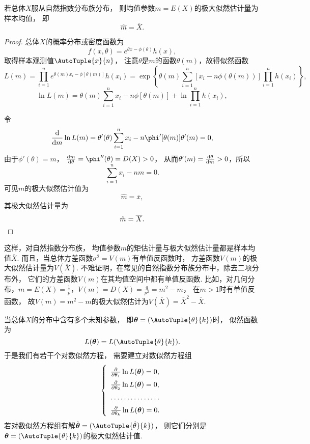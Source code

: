 \begin{theorem}
若总体\(X\)服从自然指数分布族分布，
则均值参数\(m=E(X)\)的极大似然估计量为样本均值，
即\[
	\hat{m}=\overline{X}.
\]
\begin{proof}
总体\(X\)的概率分布或密度函数为\[
	f(x,\theta)=e^{\theta x - \phi(\theta)} h(x),
\]
取得样本观测值\(\AutoTuple{x}{n}\)，
注意\(\theta\)是\(m\)的函数\(\theta(m)\)，故得似然函数\[
	L(m) = \prod_{i=1}^n e^{\theta(m) x_i -\phi[\theta(m)]} h(x_i)
	= \exp\left\{
		\theta(m) \sum_{i=1}^n[x_i - n \phi(\theta(m))]
		\prod_{i=1}^n{h(x_i)}
	\right\},
\]\[
	\ln L(m)
	= \theta(m) \sum_{i=1}^n x_i - n \phi[\theta(m)]
	+ \ln \prod_{i=1}^n{h(x_i)},
\]

令\[
	\dv{m} \ln L(m)
	= \theta'(\theta) \sum_{i=1}^n{x_i}
	- n \phi'[\theta(m)] \theta'(m) = 0,
\]
由于\(\phi'(\theta) = m\)，
\(\dv{m}{\theta} = \phi''(\theta) = D(X) > 0\)，
从而\(\theta'(m) = \dv{\theta}{m} > 0\)，所以\[
	\sum_{i=1}^n{x_i} - nm = 0.
\]
可见\(m\)的极大似然估计值为\[
	\hat{m} = \overline{x},
\]
其极大似然估计量为\[
	\hat{m} = \overline{X}.
	\qedhere
\]
\end{proof}
\end{theorem}

这样，对自然指数分布族，
均值参数\(m\)的矩估计量与极大似然估计量都是样本均值\(\overline{X}\).
而且，当总体方差函数\(\sigma^2=V(m)\)有单值反函数时，
方差函数\(V(m)\)的极大似然估计量为\(V(\overline{X})\).
不难证明，在常见的自然指数分布族分布中，除去二项分布外，
它们的方差函数\(V(m)\)在其均值空间中都有单值反函数.
比如，对几何分布，\(m=E(X)=\frac{1}{p}\)，\(V(m)=D(X)=\frac{q}{p^2}=m^2-m\)，
在\(m>1\)时有单值反函数，
故\(V(m)=m^2-m\)的极大似然估计为\(V(\overline{X})=\overline{X}^2 - \overline{X}\).

当总体\(X\)的分布中含有多个未知参数，
即\(\vb{\theta}=(\AutoTuple{\theta}{k})\)时，
似然函数为\[
	L(\vb{\theta})
	= L(\AutoTuple{\theta}{k}).
\]
于是我们有若干个对数似然方程，
需要建立对数似然方程组\[
	\def\g#1{\pdv{\theta_{#1}} \ln L(\vb{\theta}) = 0}
	\left\{ \def\arraystretch{1.5} \begin{array}{l}
		\g{1}, \\
		\g{2}, \\
		\hdotsfor{1} \\
		\g{k}. \\
	\end{array} \right.
\]
若对数似然方程组有解\(\hat{\vb\theta}=(\AutoTuple{\hat{\theta}}{k})\)，
则它们分别是\(\vb\theta=(\AutoTuple{\theta}{k})\)的极大似然估计值.

